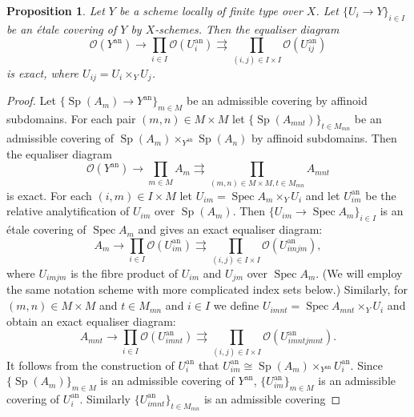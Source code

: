 \documentclass[10pt,a4paper]{amsart}
\newtheorem{prop}{Proposition}
\newcommand{\OO}{\mathcal O}
\DeclareMathOperator{\Sp}{Sp}
\DeclareMathOperator{\Spec}{Spec}
\newcommand{\ana}{\mathrm{an}}
\begin{document}
\begin{prop}\label{etale_cover} Let $Y$ be a scheme locally of finite type over $X$. Let $\{U_i\rightarrow Y\}_{i\in I}$ be an \'etale covering of $Y$ by $X$-schemes. Then the
equaliser diagram 
\begin{equation}\label{eq0}
\OO(Y^{\ana})\rightarrow \prod_{i\in I} \OO(U_i^{\ana})\rightrightarrows
\prod_{(i,j)\in I\times I} \OO(U_{ij}^{\ana})
\end{equation}
is exact, where $U_{ij}= U_i\times_Y U_j$.
\end{prop}

\begin{proof} 
Let $\{\Sp(A_m)\rightarrow Y^{\ana}\}_{m\in M}$ be an admissible covering by affinoid subdomains. For each 
pair $(m,n)\in M\times M$ let 
 $\{\Sp(A_{mnt})\}_{t\in M_{mn}}$
be an admissible covering of $\Sp(A_m)\times_{Y^{\ana}} \Sp(A_n)$
by affinoid subdomains. Then the equaliser diagram 
\begin{equation}\label{eq1}
\OO(Y^{\ana})\rightarrow \prod_{m\in M} A_m \rightrightarrows \prod_{(m,n)\in M\times M, t\in M_{mn}} A_{mnt}
\end{equation}
is exact. For each $(i,m)\in I\times M$ let $U_{im}= \Spec A_m\times_{Y} U_i$ and let $U_{im}^{\ana}$ be the relative 
analytification of $U_{im}$ over $\Sp(A_m)$. Then 
 $\{U_{im}\rightarrow \Spec A_m \}_{i\in I}$ is an \'etale covering of $\Spec A_m$ and  gives an exact equaliser diagram: 
\begin{equation}\label{eq2}
A_{m}\rightarrow \prod_{i\in I} \OO(U_{im}^{\ana})\rightrightarrows \prod_{(i,j)\in I\times I} \OO(U_{imjm}^{\ana}),
\end{equation}
where $U_{imjm}$ is the fibre product of $U_{im}$ and $U_{jm}$ over $\Spec A_{m}$. (We will employ the same notation scheme with more complicated index sets below.) Similarly, for $(m, n)\in M\times M$ and $t\in M_{mn}$ and $i\in I$ we define $U_{imnt}=\Spec A_{mnt}\times_Y U_i$ and obtain an exact equaliser diagram: 
\begin{equation}\label{eq3}
A_{mnt}\rightarrow \prod_{i\in I} \OO(U_{imnt}^{\ana})\rightrightarrows \prod_{(i,j)\in I\times I} \OO(U_{imntjmnt}^{\ana}).
\end{equation}
It follows from the construction of $U_i^{\ana}$ that 
$U_{im}^{\ana}\cong \Sp(A_m)\times_{Y^{\ana}} U_i^{\ana}$. 
Since $\{\Sp(A_m)\}_{m\in M}$ is an admissible covering of $Y^{\ana}$, 
$\{U_{im}^{\ana}\}_{m\in M}$ is an admissible covering of $U_i^{\ana}$. Similarly $\{U_{imnt}^{\ana}\}_{t\in M_{mn}}$ is an admissible covering 

\end{proof}
\end{document}
